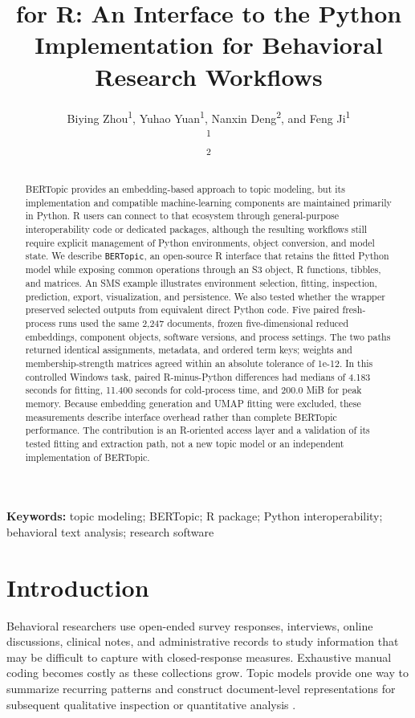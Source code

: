 \documentclass[12pt]{article}
\title{\pkg{BERTopic} for R: An Interface to the Python Implementation for Behavioral Research Workflows}
\author{
Biying Zhou\textsuperscript{1},
Yuhao Yuan\textsuperscript{1},
Nanxin Deng\textsuperscript{2},
and Feng Ji\textsuperscript{1}\\[0.5em]
\textsuperscript{1}\todo{Affiliation}\\
\textsuperscript{2}\todo{Affiliation}\\[0.5em]
\parbox{0.82\textwidth}{\centering
\todo{Corresponding author name, postal address, telephone number, and email}}
}
\date{}
\newcommand{\pkg}[1]{\texttt{#1}}
\begin{document}
\maketitle
\thispagestyle{fancy}

\begin{abstract}
BERTopic provides an embedding-based approach to topic modeling, but its implementation and compatible machine-learning components are maintained primarily in Python. R users can connect to that ecosystem through general-purpose interoperability code or dedicated packages, although the resulting workflows still require explicit management of Python environments, object conversion, and model state. We describe \pkg{BERTopic}, an open-source R interface that retains the fitted Python model while exposing common operations through an S3 object, R functions, tibbles, and matrices. An SMS example illustrates environment selection, fitting, inspection, prediction, export, visualization, and persistence. We also tested whether the wrapper preserved selected outputs from equivalent direct Python code. Five paired fresh-process runs used the same 2,247 documents, frozen five-dimensional reduced embeddings, component objects, software versions, and process settings. The two paths returned identical assignments, metadata, and ordered term keys; weights and membership-strength matrices agreed within an absolute tolerance of 1e-12. In this controlled Windows task, paired R-minus-Python differences had medians of 4.183 seconds for fitting, 11.400 seconds for cold-process time, and 200.0 MiB for peak memory. Because embedding generation and UMAP fitting were excluded, these measurements describe interface overhead rather than complete BERTopic performance. The contribution is an R-oriented access layer and a validation of its tested fitting and extraction path, not a new topic model or an independent implementation of BERTopic.
\end{abstract}

\noindent\textbf{Keywords:} topic modeling; BERTopic; R package; Python interoperability; behavioral text analysis; research software

\section{Introduction}

Behavioral researchers use open-ended survey responses, interviews, online discussions, clinical notes, and administrative records to study information that may be difficult to capture with closed-response measures. Exhaustive manual coding becomes costly as these collections grow. Topic models provide one way to summarize recurring patterns and construct document-level representations for subsequent qualitative inspection or quantitative analysis \citep{blei2003latent,grimmer2013text,roberts2014structural}.
\end{document}
